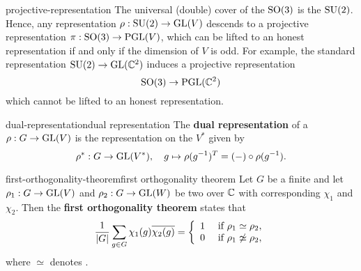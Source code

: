 \begin{example}{projective-representation}
    The universal (double) cover of the  $\textup{SO}(3)$ is the  $\textup{SU}(2)$. Hence, any representation $\rho : \textup{SU}(2) \to \textup{GL}(V)$ descends to a projective representation $\pi : \textup{SO}(3) \to \textup{PGL}(V)$, which can be lifted to an honest representation if and only if the dimension of $V$ is odd. For example, the standard representation $\textup{SU}(2) \to \textup{GL}(\mathbb{C}^2)$ induces a projective representation
    \[ \textup{SO}(3) \to \textup{PGL}(\mathbb{C}^2) \]
    which cannot be lifted to an honest representation.
\end{example}


\begin{topic}{dual-representation}{dual representation}
    The \textbf{dual representation} of a  $\rho : G \to \textup{GL}(V)$ is the representation on the  $V^*$ given by
    \[ \rho^* : G \to \textup{GL}(V^*), \quad g \mapsto \rho(g^{-1})^T = (-) \circ \rho(g^{-1}) . \]
\end{topic}

\begin{topic}{first-orthogonality-theorem}{first orthogonality theorem}
    Let $G$ be a finite  and let $\rho_1 : G \to \textup{GL}(V)$ and $\rho_2 : G \to \textup{GL}(W)$ be two  over $\mathbb{C}$ with corresponding  $\chi_1$ and $\chi_2$. Then the \textbf{first orthogonality theorem} states that
    \[ \frac{1}{|G|} \sum_{g \in G} \chi_1(g) \overline{\chi_2(g)} = \left\{ \begin{array}{cl} 1 & \textup{ if } \rho_1 \simeq \rho_2 , \\ 0 & \textup{ if } \rho_1 \not\simeq \rho_2 , \end{array} \right. \]
    where $\simeq$ denotes .
\end{topic}

